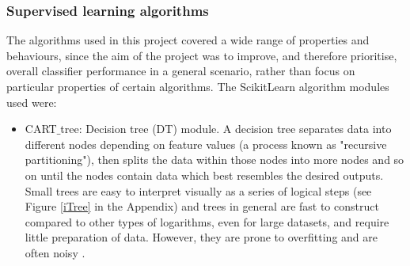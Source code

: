 \documentclass[12pt]{article}
\begin{document}
\subsubsection{Supervised learning algorithms}
The algorithms used in this project covered a wide range of properties and behaviours, since the aim of the project was to improve, and therefore prioritise, overall classifier performance in a general scenario, rather than focus on particular properties of certain algorithms. The ScikitLearn algorithm modules used \cite{scikit-learn} were:
\begin{itemize}
\item CART$\_$tree: Decision tree (DT) module. A decision tree separates data into different nodes depending on feature values (a process known as "recursive partitioning"), then splits the data within those nodes into more nodes and so on until the nodes contain data which best resembles the desired outputs. Small trees are easy to interpret visually as a series of logical steps (see Figure \ref{iTree} in the Appendix) and trees in general are fast to construct compared to other types of logarithms, even for large datasets, and require little preparation of data. However, they are prone to overfitting and are often noisy \cite{friedman2001elements}.


\end{itemize}
\end{document}
